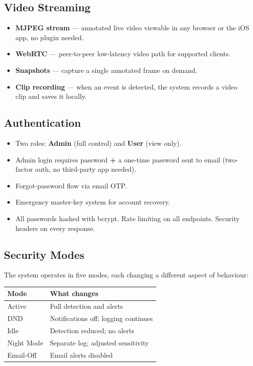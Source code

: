 \documentclass[12pt,a4paper]{article}
\begin{document}
\subsection*{Video Streaming}
\begin{itemize}[leftmargin=2em, itemsep=2pt]
  \item \textbf{MJPEG stream} — annotated live video viewable in any browser
        or the iOS app, no plugin needed.
  \item \textbf{WebRTC} — peer-to-peer low-latency video path for supported
        clients.
  \item \textbf{Snapshots} — capture a single annotated frame on demand.
  \item \textbf{Clip recording} — when an event is detected, the system
        records a video clip and saves it locally.
\end{itemize}

\subsection*{Authentication}
\begin{itemize}[leftmargin=2em, itemsep=2pt]
  \item Two roles: \textbf{Admin} (full control) and \textbf{User}
        (view only).
  \item Admin login requires password \textbf{+} a one-time password
        sent to email (two-factor auth, no third-party app needed).
  \item Forgot-password flow via email OTP.
  \item Emergency master-key system for account recovery.
  \item All passwords hashed with bcrypt. Rate limiting on all endpoints.
        Security headers on every response.
\end{itemize}

\subsection*{Security Modes}
The system operates in five modes, each changing a different aspect of
behaviour:

\begin{center}
\begin{tabular}{ll}
\toprule
\textbf{Mode} & \textbf{What changes} \\
\midrule
Active       & Full detection and alerts \\
DND          & Notifications off; logging continues \\
Idle         & Detection reduced; no alerts \\
Night Mode   & Separate log; adjusted sensitivity \\
Email-Off    & Email alerts disabled \\
\bottomrule
\end{tabular}
\end{center}
\end{document}
